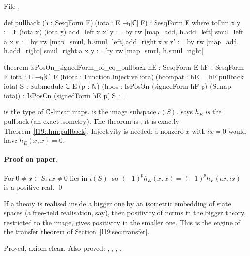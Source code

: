 \noindent File .
\begin{leancode}
def pullback (h : SesqForm F) (iota : E →ₗ[ℂ] F) : SesqForm E where
  toFun x y := h (iota x) (iota y)
  add_left x x' y := by rw [map_add, h.add_left]
  smul_left a x y := by rw [map_smul, h.smul_left]
  add_right x y y' := by rw [map_add, h.add_right]
  smul_right a x y := by rw [map_smul, h.smul_right]

theorem isPosOn_signedForm_of_eq_pullback {hE : SesqForm E} {hF : SesqForm F}
    {iota : E →ₗ[ℂ] F} (hiota : Function.Injective iota)
    (hcompat : hE = hF.pullback iota) {S : Submodule ℂ E} (p : ℕ)
    (hpos : IsPosOn (signedForm hF p) (S.map iota)) :
    IsPosOn (signedForm hE p) S :=
\end{leancode}

\begin{dictionary}
 is the type of ${\mathbb{C}}$-linear maps.  is the image subspace
$\iota(S)$.  says $h_E$ \emph{is} the pullback (an exact
isometry). The theorem is \allowbreak{}\allowbreak{}\allowbreak{}\allowbreak{}\allowbreak{}; it is exactly
Theorem~\ref{l19:thm:pullback}. Injectivity is needed: a nonzero $x$ with $\iota x = 0$ would have
$h_E(x,x) = 0$.
\end{dictionary}

\paragraph{Proof on paper.} For $0\ne x\in S$, $\iota x\ne0$ lies in $\iota(S)$, so
$(-1)^ph_E(x,x) = (-1)^ph_F(\iota x,\iota x)$ is a positive real. \qed

\begin{physics}
If a theory is realised inside a bigger one by an isometric embedding of state spaces (a free-field
realisation, say), then positivity of norms in the bigger theory, restricted to the image,
gives positivity in the smaller one.
This is the engine of the transfer theorem of Section~\ref{l19:sec:transfer}.
\end{physics}

\begin{status}
Proved, axiom-clean. Also proved: , ,
, .
\end{status}

